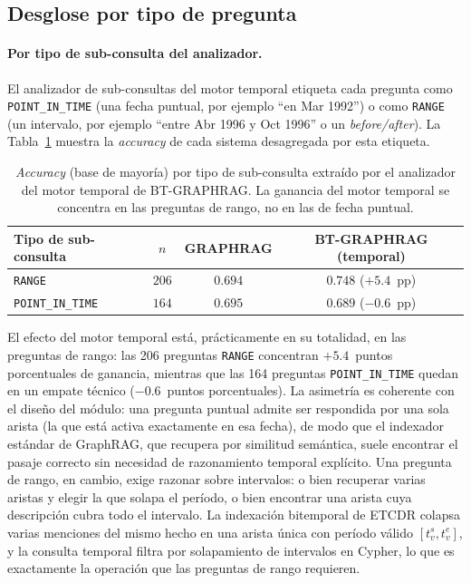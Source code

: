\subsection{Desglose por tipo de pregunta}\label{sec:eval-timeqa-by-type}

\paragraph{Por tipo de sub-consulta del analizador.} El analizador de sub-consultas del motor temporal etiqueta cada pregunta como \texttt{POINT\_IN\_TIME} (una fecha puntual, por ejemplo ``en Mar 1992'') o como \texttt{RANGE} (un intervalo, por ejemplo ``entre Abr 1996 y Oct 1996'' o un \emph{before/after}). La Tabla~\ref{tab:eval-timeqa-by-querytype} muestra la \emph{accuracy} de cada sistema desagregada por esta etiqueta.

\begin{table}[h]
\centering
\small
\begin{tabular}{lccc}
\hline
\textbf{Tipo de sub-consulta} & \textbf{$n$} & \textbf{GRAPHRAG} & \textbf{BT-GRAPHRAG (temporal)} \\ \hline
\texttt{RANGE}          & $206$ & $0.694$ & $\mathbf{0.748}$ \quad ($+5.4$~pp) \\
\texttt{POINT\_IN\_TIME} & $164$ & $0.695$ & $0.689$ \quad ($-0.6$~pp) \\ \hline
\end{tabular}
\caption{\emph{Accuracy} (base de mayoría) por tipo de sub-consulta extraído por el analizador del motor temporal de BT-GRAPHRAG. La ganancia del motor temporal se concentra en las preguntas de rango, no en las de fecha puntual.}
\label{tab:eval-timeqa-by-querytype}
\end{table}

El efecto del motor temporal está, prácticamente en su totalidad, en las preguntas de rango: las 206 preguntas \texttt{RANGE} concentran $+5.4$~puntos porcentuales de ganancia, mientras que las 164 preguntas \texttt{POINT\_IN\_TIME} quedan en un empate técnico ($-0.6$~puntos porcentuales). La asimetría es coherente con el diseño del módulo: una pregunta puntual admite ser respondida por una sola arista (la que está activa exactamente en esa fecha), de modo que el indexador estándar de GraphRAG, que recupera por similitud semántica, suele encontrar el pasaje correcto sin necesidad de razonamiento temporal explícito. Una pregunta de rango, en cambio, exige razonar sobre intervalos: o bien recuperar varias aristas y elegir la que solapa el período, o bien encontrar una arista cuya descripción cubra todo el intervalo. La indexación bitemporal de ETCDR colapsa varias menciones del mismo hecho en una arista única con período válido $[t_v^s, t_v^e]$, y la consulta temporal filtra por solapamiento de intervalos en Cypher, lo que es exactamente la operación que las preguntas de rango requieren.

